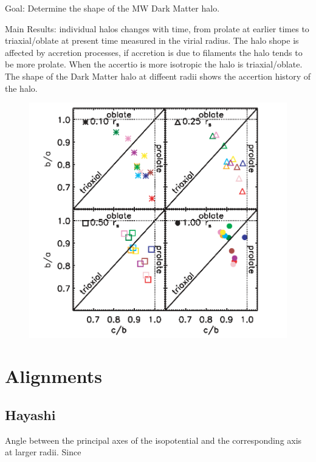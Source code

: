 \documentclass[12pt]{article}
\begin{document}
Goal:  Determine the shape of the MW Dark Matter halo.

Main Results: individual halos changes with time, from prolate at earlier times 
to triaxial/oblate at present time measured in the virial radius. The halo 
shope is affected by accretion processes, if accretion is due to filaments
the halo tends to be more prolate. When the accertio is more isotropic the halo
is triaxial/oblate. The shape of the Dark Matter halo at diffeent radii shows 
the accertion history of the halo.    



\begin{figure}
\centering
\includegraphics[scale=0.5]{prolateoblatehayashi.png}
\end{figure}


\section{Alignments}

\subsection{Hayashi}

Angle between the principal axes of the isopotential and the corresponding
axis at larger radii. Since
\end{document}
